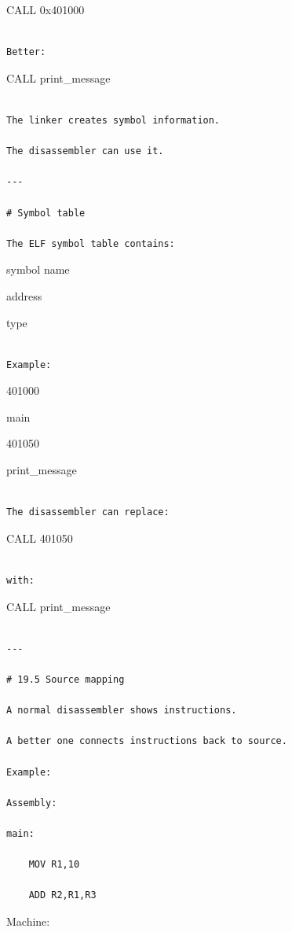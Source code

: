 \documentclass[
  oneside,
  openany]{book}
\begin{document}
CALL 0x401000

\begin{verbatim}

Better:
\end{verbatim}

CALL print\_message

\begin{verbatim}

The linker creates symbol information.

The disassembler can use it.

---

# Symbol table

The ELF symbol table contains:
\end{verbatim}

symbol name

address

type

\begin{verbatim}

Example:
\end{verbatim}

401000

main

401050

print\_message

\begin{verbatim}

The disassembler can replace:
\end{verbatim}

CALL 401050

\begin{verbatim}

with:
\end{verbatim}

CALL print\_message

\begin{verbatim}

---

# 19.5 Source mapping

A normal disassembler shows instructions.

A better one connects instructions back to source.

Example:

Assembly:

main:

    MOV R1,10

    ADD R2,R1,R3
\end{verbatim}

Machine:
\end{document}
